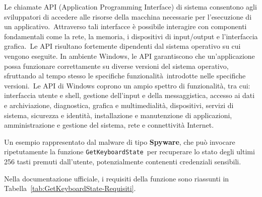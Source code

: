 
Le chiamate API (Application Programming Interface) di sistema consentono agli sviluppatori di accedere alle risorse della macchina necessarie per l'esecuzione di un applicativo.\
Attraverso tali interfacce è possibile interagire con componenti fondamentali come la rete, la memoria, i dispositivi di input/output e l'interfaccia grafica.\
Le API risultano fortemente dipendenti dal sistema operativo su cui vengono eseguite.
In ambiente Windows, le API garantiscono che un'applicazione possa funzionare correttamente su diverse versioni del sistema operativo, sfruttando al tempo stesso le specifiche funzionalità\
introdotte nelle specifiche versioni.\
Le API di Windows coprono un ampio spettro di funzionalità, tra cui: interfaccia utente e shell, gestione dell'input e della messaggistica, accesso ai dati e archiviazione,
diagnostica, grafica e multimedialità, dispositivi, servizi di sistema, sicurezza e identità, installazione e manutenzione di applicazioni, amministrazione e gestione del sistema, rete e connettività Internet.

Un esempio rappresentato dal malware di tipo \textbf{Spyware}, che può invocare ripetutamente la funzione \texttt{GetKeyboardState}\
per recuperare lo stato degli ultimi 256 tasti premuti dall'utente, potenzialmente contenenti credenziali sensibili.

Nella documentazione ufficiale, i requisiti della funzione sono riassunti in Tabella~\ref{tab:GetKeyboardState-Requisiti}.

